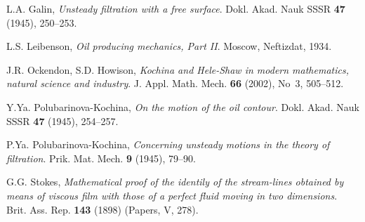 \documentclass[10pt,a4paper]{article}
\begin{document}
\begin{thebibliography}{7}

{L.A. Galin,}
\emph{Unsteady filtration with a free surface}.
Dokl. Akad. Nauk SSSR {\bf 47} (1945), 250--253.

{L.S. Leibenson,}
\emph{Oil producing mechanics, Part II}.
Moscow, Neftizdat,  1934.

{J.R. Ockendon, S.D. Howison,}
\emph{Kochina and Hele-Shaw in
modern mathematics, natural science and industry}.
J. Appl. Math. Mech. {\bf 66} (2002), No~3, 505--512.

{Y.Ya. Polubarinova-Kochina,}
\emph{On the motion of the oil contour}.
{Dokl. Akad. Nauk SSSR} {\bf 47} (1945), 254--257.

{P.Ya. Polubarinova-Kochina,}
\emph{Concerning unsteady motions in the theory of filtration}.
{Prik. Mat. Mech.} {\bf 9} (1945), 79--90.

{G.G. Stokes,}
\emph{Mathematical proof of the identily of the
stream-lines obtained by means of viscous film with those of a
perfect fluid moving in two dimensions}.
{Brit. Ass. Rep.} \textbf{143} (1898) (Papers, V, 278).

\end{thebibliography}
\end{document}
